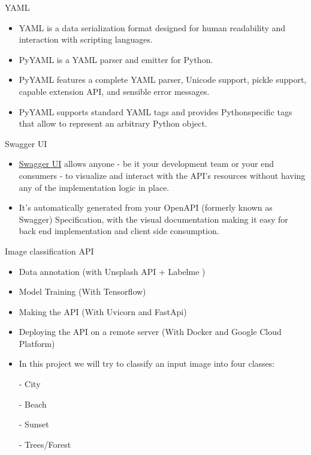 \documentclass[aspectratio=169,12pt,usenames,dvipsnames]{beamer}
\begin{document}
\begin{frame}[t]{YAML}
\begin{itemize}
\item YAML is a data serialization format designed for human readability and interaction with scripting languages.
\item PyYAML is a YAML parser and emitter for Python.
\item PyYAML features a complete YAML parser, Unicode support, pickle support, capable extension API, and sensible error messages.
\item PyYAML supports standard YAML tags and provides Pythonspecific tags that allow to represent an arbitrary Python object.
\end{itemize}
\end{frame}


\begin{frame}[t]{Swagger UI}
\begin{itemize}
\item \href{https://swagger.io/tools/swagger-ui/}{Swagger UI} allows anyone - be it your development team or your end consumers - to visualize and interact with the API's resources without having any of the implementation logic in place.
\item It's automatically generated from your OpenAPI (formerly known as Swagger) Specification, with the visual documentation making it easy for back end implementation and client side consumption.
\end{itemize}
\end{frame}


\begin{frame}[t]{Image classification API}
\begin{itemize}
  \item Data annotation (with Unsplash API + Labelme )

  \item Model Training (With Tensorflow)

  \item Making the API (With Uvicorn and FastApi)

  \item Deploying the API on a remote server (With Docker and Google Cloud Platform)

  \item In this project we will try to classify an input image into four classes:

  - City

  - Beach

  - Sunset

  - Trees/Forest

\end{itemize}
\end{frame}
\end{document}
